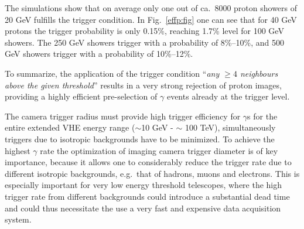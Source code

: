 
The simulations show that on average only one out of ca.~8000 proton
showers of 20 GeV fulfills the trigger condition.  In
Fig.~\ref{effp:fig} one can see that for 40 GeV protons the trigger
probability is only 0.15\%, reaching 1.7\% level for 100 GeV
showers. The 250 GeV showers trigger with a probability of 8\%--10\%,
and 500 GeV showers trigger with a probability of 10\%--12\%.

To summarize, the application of the trigger condition
``{\sl any $\geq 4$ neighbours
above the given threshold}''  results in a very
strong rejection of proton images, providing a highly efficient
pre-selection of $\gamma$ events already at the trigger level.

The camera trigger radius must provide high trigger efficiency for
$\gamma$s for the entire extended
VHE energy range ($\sim$10 GeV - $\sim$ 100 TeV),
simultaneously triggers
due to isotropic backgrounds have to be minimized. 
To achieve the highest $\gamma$ rate the
optimization of imaging camera trigger diameter is of key importance,
because it allows one to considerably reduce the trigger rate due to
different isotropic backgrounds, e.g.\ that of hadrons, muons and
electrons. This is especially important for very low energy threshold
telescopes, where the high trigger rate from different backgrounds could
introduce a substantial dead time and could thus
necessitate the use a very fast and
expensive data acquisition system.


